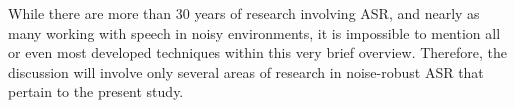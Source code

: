 \documentclass[dissertation,copyright]{uathesis}
\begin{document}

% 

While there are more than 30 years of research involving ASR, and nearly as many working with speech in noisy environments, it is impossible to mention all or even most developed techniques within this very brief overview.  Therefore, the discussion will involve only several areas of research in noise-robust ASR that pertain to the present study.
\end{document}
